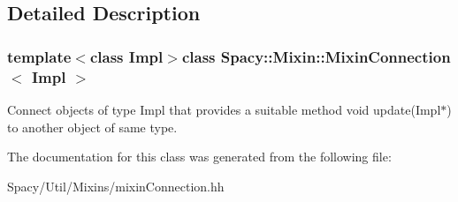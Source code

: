 \subsection{Detailed Description}
\subsubsection*{template$<$class Impl$>$class Spacy\+::\+Mixin\+::\+Mixin\+Connection$<$ Impl $>$}

Connect objects of type Impl that provides a suitable method void update(\+Impl$\ast$) to another object of same type. 

The documentation for this class was generated from the following file\+:\begin{DoxyCompactItemize}
\item 
Spacy/\+Util/\+Mixins/mixin\+Connection.\+hh\end{DoxyCompactItemize}
